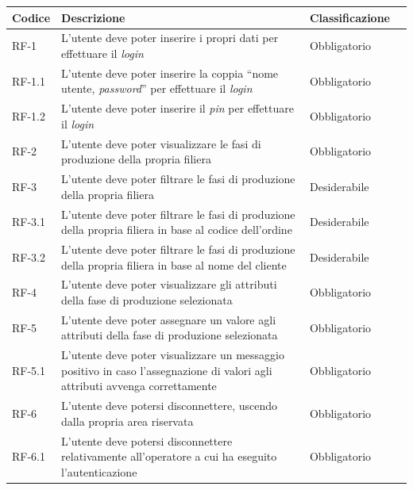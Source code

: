 \begin{longtable}{>{\centering\arraybackslash}m{}>{\centering\arraybackslash}m{}>{\centering\arraybackslash}m{}>{\centering\arraybackslash}m{}}
    \hline
    \rowcolor{black}
    \color{white}\textbf{Codice} & \color{white}\textbf{Descrizione} & \color{white}\textbf{Classificazione} \\
    \hline
    \endhead %
    RF-1 & L’utente deve poter inserire i propri dati per effettuare il \textit{login} & Obbligatorio \\
    \hline
    RF-1.1 & L’utente deve poter inserire la coppia “nome utente, \textit{password}” per effettuare il \textit{login} & Obbligatorio \\
    \hline
    RF-1.2 & L’utente deve poter inserire il \textit{pin} per effettuare il \textit{login} & Obbligatorio \\
    \hline
    RF-2 & L’utente deve poter visualizzare le fasi di produzione della propria filiera & Obbligatorio \\
    \hline
    RF-3 & L’utente deve poter filtrare le fasi di produzione della propria filiera & Desiderabile \\
    \hline
    RF-3.1 & L’utente deve poter filtrare le fasi di produzione della propria filiera in base al codice dell’ordine & Desiderabile \\
    \hline
    RF-3.2 & L’utente deve poter filtrare le fasi di produzione della propria filiera in base al nome del cliente & Desiderabile \\
    \hline
    RF-4 & L’utente deve poter visualizzare gli attributi della fase di produzione selezionata & Obbligatorio \\
    \hline
    RF-5 & L’utente deve poter assegnare un valore agli attributi della fase di produzione selezionata & Obbligatorio \\
    \hline
    RF-5.1 & L’utente deve poter visualizzare un messaggio positivo in caso l’assegnazione di valori agli attributi avvenga correttamente & Obbligatorio \\
    \hline
    RF-6 & L’utente deve potersi disconnettere, uscendo dalla propria area riservata & Obbligatorio \\
    \hline
    RF-6.1 & L’utente deve potersi disconnettere relativamente all’operatore a cui ha eseguito l’autenticazione & Obbligatorio \\

\end{longtable}
